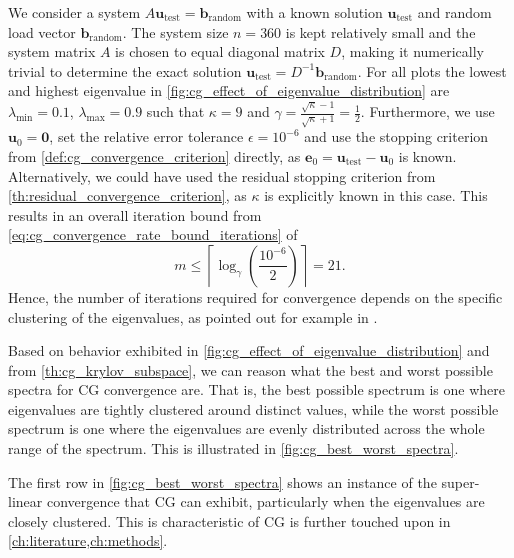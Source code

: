 We consider a system $A\mathbf{u}_{\text{test}} = \mathbf{b}_{\text{random}}$ with a known solution $\mathbf{u}_{\text{test}}$ and random load vector $\mathbf{b}_{\text{random}}$. The system size $n=360$ is kept relatively small and the system matrix $A$ is chosen to equal diagonal matrix $D$, making it numerically trivial to determine the exact solution $\mathbf{u}_{\text{test}} = D^{-1}\mathbf{b}_{\text{random}}$. For all plots the lowest and highest eigenvalue in \cref{fig:cg_effect_of_eigenvalue_distribution} are $\lambda_{\text{min}} = 0.1$, $\lambda_{\text{max}} = 0.9$ such that $\kappa = 9$ and $\gamma = \frac{\sqrt{\kappa} - 1}{\sqrt{\kappa} + 1} = \frac{1}{2}$. Furthermore, we use $\mathbf{u}_{0} = \mathbf{0}$, set the relative error tolerance $\epsilon = 10^{-6}$ and use the stopping criterion from \cref{def:cg_convergence_criterion} directly, as $\mathbf{e}_0 = \mathbf{u}_{\text{test}} - \mathbf{u}_{0}$ is known. Alternatively, we could have used the residual stopping criterion from \cref{th:residual_convergence_criterion}, as $\kappa$ is explicitly known in this case. This results in an overall iteration bound from \cref{eq:cg_convergence_rate_bound_iterations} of
\[
  m \leq \left\lceil\log_{\gamma}\left(\frac{10^{-6}}{2}\right)\right\rceil = 21.
\]
Hence, the number of iterations required for convergence depends on the specific clustering of the eigenvalues, as pointed out for example in \cite[Section 2.3]{nonlinear_cg_Kelley_1995}.

Based on behavior exhibited in \cref{fig:cg_effect_of_eigenvalue_distribution} and from \cref{th:cg_krylov_subspace}, we can reason what the best and worst possible spectra for CG convergence are. That is, the best possible spectrum is one where eigenvalues are tightly clustered around distinct values, while the worst possible spectrum is one where the eigenvalues are evenly distributed across the whole range of the spectrum. This is illustrated in \cref{fig:cg_best_worst_spectra}.

The first row in \cref{fig:cg_best_worst_spectra} shows an instance of the super-linear convergence that CG can exhibit, particularly when the eigenvalues are closely clustered. This is characteristic of CG is further touched upon in \cref{ch:literature,ch:methods}.

